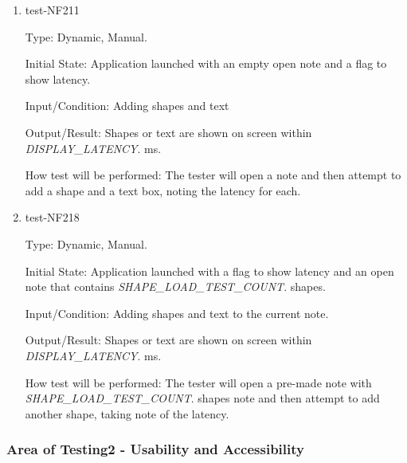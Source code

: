 \documentclass[12pt, titlepage]{article}
\begin{document}
\begin{enumerate}

\item{test-NF211}

Type: Dynamic, Manual.

Initial State: Application launched with an empty open note and a flag to show latency.

Input/Condition: Adding shapes and text 

Output/Result: Shapes or text are shown on screen within \textit{DISPLAY\_LATENCY}. ms. 

How test will be performed: The tester will open a note and then attempt to add a shape and a text box, noting the latency for each. 

\item{test-NF218}

Type: Dynamic, Manual.

Initial State: Application launched with a flag to show latency and an open note that contains \textit{SHAPE\_LOAD\_TEST\_COUNT}. shapes.

Input/Condition: Adding shapes and text to the current note. 

Output/Result: Shapes or text are shown on screen within \textit{DISPLAY\_LATENCY}. ms. 

How test will be performed: The tester will open a pre-made note with \textit{SHAPE\_LOAD\_TEST\_COUNT}. shapes note and then attempt to add another shape, taking note of the latency. 

\end{enumerate}

\subsubsection{Area of Testing2 - Usability and Accessibility}
\end{document}
